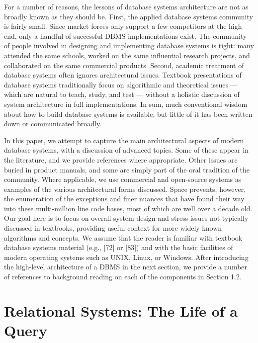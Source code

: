 \documentclass[b5paper,11pt,twoside,openright]{book}
\begin{document}
For a number of reasons, the lessons of database systems architecture
are not as broadly known as they should be. First, the applied database
systems community is fairly small. Since market forces only support a
few competitors at the high end, only a handful of successful DBMS
implementations exist. The community of people involved in designing and
implementing database systems is tight: many attended the same schools,
worked on the same influential research projects, and collaborated on
the same commercial products. Second, academic treatment of database
systems often ignores architectural issues. Textbook presentations of
database systems traditionally focus on algorithmic and theoretical
issues --- which are natural to teach, study, and test --- without a
holistic discussion of system architecture in full implementations. In
sum, much conventional wisdom about how to build database systems is
available, but little of it has been written down or communicated
broadly.

In this paper, we attempt to capture the main architectural aspects of
modern database systems, with a discussion of advanced topics. Some of
these appear in the literature, and we provide references where
appropriate. Other issues are buried in product manuals, and some are
simply part of the oral tradition of the community. Where applicable, we
use commercial and open-source systems as examples of the various
architectural forms discussed. Space prevents, however, the enumeration
of the exceptions and finer nuances that have found their way into these
multi-million line code bases, most of which are well over a decade old.
Our goal here is to focus on overall system design and stress issues not
typically discussed in textbooks, providing useful context for more
widely known algorithms and concepts. We assume that the reader is
familiar with textbook database systems material (e.g., {[}72{]} or
{[}83{]}) and with the basic facilities of modern operating systems such
as UNIX, Linux, or Windows. After introducing the high-level
architecture of a DBMS in the next section, we provide a number of
references to background reading on each of the components in Section
1.2.

\hypertarget{relational-systems-the-life-of-a-query}{%
\section{Relational Systems: The Life of a
Query}\label{relational-systems-the-life-of-a-query}}
\end{document}
